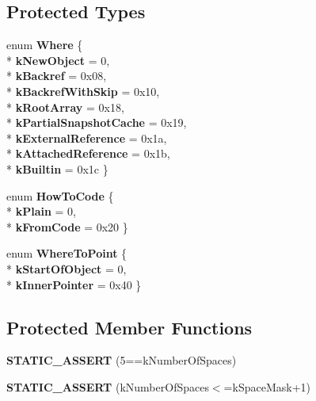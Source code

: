 \subsection*{Protected Types}
\begin{DoxyCompactItemize}
\item 
enum {\bfseries Where} \{ \\*
{\bfseries k\+New\+Object} = 0, 
\\*
{\bfseries k\+Backref} = 0x08, 
\\*
{\bfseries k\+Backref\+With\+Skip} = 0x10, 
\\*
{\bfseries k\+Root\+Array} = 0x18, 
\\*
{\bfseries k\+Partial\+Snapshot\+Cache} = 0x19, 
\\*
{\bfseries k\+External\+Reference} = 0x1a, 
\\*
{\bfseries k\+Attached\+Reference} = 0x1b, 
\\*
{\bfseries k\+Builtin} = 0x1c
 \}\hypertarget{classv8_1_1internal_1_1_serializer_deserializer_a338d50f92903ec056650135e60139c8a}{}\label{classv8_1_1internal_1_1_serializer_deserializer_a338d50f92903ec056650135e60139c8a}

\item 
enum {\bfseries How\+To\+Code} \{ \\*
{\bfseries k\+Plain} = 0, 
\\*
{\bfseries k\+From\+Code} = 0x20
 \}\hypertarget{classv8_1_1internal_1_1_serializer_deserializer_a3806541ecf89447911d72c6ccd7bb43e}{}\label{classv8_1_1internal_1_1_serializer_deserializer_a3806541ecf89447911d72c6ccd7bb43e}

\item 
enum {\bfseries Where\+To\+Point} \{ \\*
{\bfseries k\+Start\+Of\+Object} = 0, 
\\*
{\bfseries k\+Inner\+Pointer} = 0x40
 \}\hypertarget{classv8_1_1internal_1_1_serializer_deserializer_ab62aa66a8d8e959c1d118dbec6d921b6}{}\label{classv8_1_1internal_1_1_serializer_deserializer_ab62aa66a8d8e959c1d118dbec6d921b6}

\end{DoxyCompactItemize}
\subsection*{Protected Member Functions}
\begin{DoxyCompactItemize}
\item 
{\bfseries S\+T\+A\+T\+I\+C\+\_\+\+A\+S\+S\+E\+RT} (5==k\+Number\+Of\+Spaces)\hypertarget{classv8_1_1internal_1_1_serializer_deserializer_a7d0c95c9736d91124222a90689b3f763}{}\label{classv8_1_1internal_1_1_serializer_deserializer_a7d0c95c9736d91124222a90689b3f763}

\item 
{\bfseries S\+T\+A\+T\+I\+C\+\_\+\+A\+S\+S\+E\+RT} (k\+Number\+Of\+Spaces$<$=k\+Space\+Mask+1)\hypertarget{classv8_1_1internal_1_1_serializer_deserializer_a3efd56038139e6f57289165962d7c9d5}{}\label{classv8_1_1internal_1_1_serializer_deserializer_a3efd56038139e6f57289165962d7c9d5}

\end{DoxyCompactItemize}
